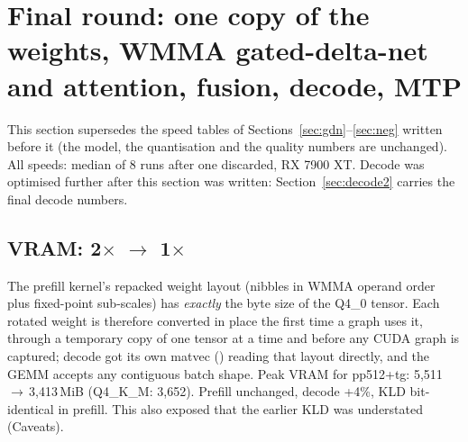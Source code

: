 \documentclass[10pt,a4paper]{article}
\newcommand{\tx}[1]{\texttt{\detokenize{#1}}}
\begin{document}
\section{Final round: one copy of the weights, WMMA gated-delta-net and attention, fusion, decode, MTP}
\label{sec:final}
This section supersedes the speed tables of Sections~\ref{sec:gdn}--\ref{sec:neg} written before it (the model, the
quantisation and the quality numbers are unchanged). All speeds: median of 8 \tx{llama-bench} runs after one discarded, RX 7900 XT. Decode was optimised further after this section was written: Section~\ref{sec:decode2} carries the final decode numbers.

\subsection{VRAM: 2$\times$ $\to$ 1$\times$}
The prefill kernel's repacked weight layout (nibbles in WMMA operand order plus fixed-point sub-scales) has \emph{exactly} the byte
size of the Q4\_0 tensor. Each rotated weight is therefore converted in place the first time a graph uses it, through a temporary copy
of one tensor at a time and before any CUDA graph is captured; decode got its own matvec (\tx{k_mv}) reading that layout directly, and
the GEMM accepts any contiguous batch shape. Peak VRAM for pp512+tg: 5{,}511\,$\to$\,3{,}413\,MiB (Q4\_K\_M: 3{,}652). Prefill
unchanged, decode +4\%, KLD bit-identical in prefill. This also exposed that the earlier \tx{fast} KLD was understated (Caveats).
\end{document}
